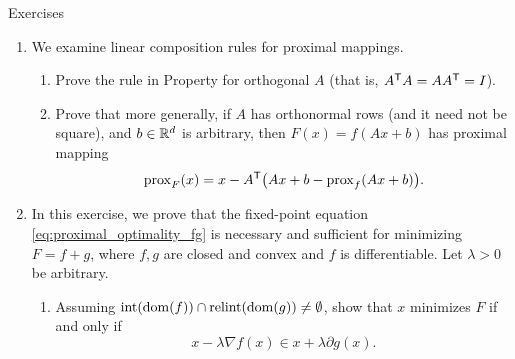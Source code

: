 \begin{xcb}{Exercises}
\begin{enumerate}[label=\thechapter.\arabic*]
\begin{enumerate}[label=\alph*.]
\item Let $f$ be permutation invariant, which means that $f(x) = f(x_\pi)$, for
  all $x$ and permutations $\pi$ (where we denote  for $\pi=(\pi_1,\dots,\pi_d)$). Show that $\prox_f$ is
  then order-preserving,  
 \[
 x_i \geq x_j \implies [\prox_f(x)]_i \geq [\prox_f(x)]_j, \quad \text{for all
   $x \in \R^d$ and $i,j$}.
 \]

\item Denote by , a
  generalized TV seminorm, defined with respect to an edge set $E$ (note that
  this generalizes \eqref{eq:tv} which corresponds to $E = \{(i, i+1) : i =
  1,\dots,d-1\}$. Prove that \eqref{eq:generalized_tv_proximal_mapping} holds
  for any permutation invariant $f$ and any edge set $E$. Hint: check that the 
  condition in part a holds, for the appropriate instantiation of cones $K_i$,
  $i=1,\dots,k$; and for this, use the order-preserving property from part b.   
\end{enumerate}

\item \label{ex:proximal_linear}
  We examine linear composition rules for proximal mappings. 

\begin{enumerate}[label=\alph*.]
\item Prove the rule in Property  for orthogonal $A$
  (that is, $A^{\mathsf{T}} A = A A^{\mathsf{T}} = I$).   

\item Prove that more generally, if $A$ has orthonormal rows (and it need not be 
  square), and $b \in \mathbb{R}^d$ is arbitrary, then $F(x) = f(Ax + b)$ has proximal
  mapping 
  \[
  \operatorname{prox}_F(x)  = x - A^{\mathsf{T}} \big(Ax + b - \operatorname{prox}_f(Ax + b) \big).
  \]
\end{enumerate}
  
\item \label{ex:proximal_optimality_fg}
  In this exercise, we prove that the fixed-point equation 
  \eqref{eq:proximal_optimality_fg} is necessary and sufficient for minimizing
  $F = f+g$, where $f,g$ are closed and convex and $f$ is differentiable. Let
  $\lambda > 0$ be arbitrary.

\begin{enumerate}[label=\alph*.]
\item Assuming $\operatorname{int}(\operatorname{dom}(f)) \cap \operatorname{relint}(\operatorname{dom}(g)) \not= \emptyset$, show
  that $x$ minimizes $F$ if and only if   
  \[
  x - \lambda \nabla f(x) \in x + \lambda \partial g(x).
  \]
  

\end{enumerate}
\end{enumerate}
\end{xcb}
